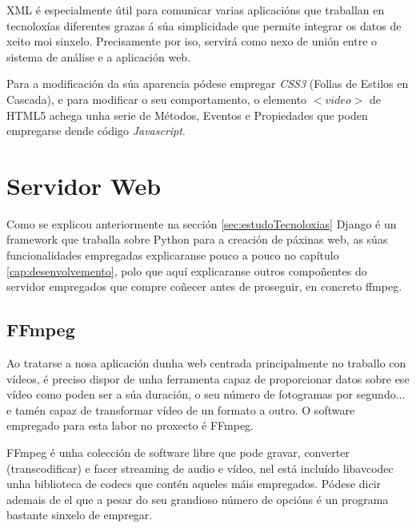    XML é especialmente útil para comunicar varias aplicacións que traballan en tecnoloxías 
    diferentes grazas á súa simplicidade que permite integrar os datos de xeito moi sinxelo. Precisamente
    por iso, servirá como nexo de unión entre o sistema de análise e a aplicación web. 
    
    Para a modificación da súa aparencia pódese empregar \emph{CSS3} (Follas de Estilos en 
    Cascada), e para modificar o seu comportamento, o elemento $<video>$ de HTML5 achega
    unha serie de Métodos, Eventos e Propiedades\cite{w3school-video-events} que poden
    empregarse dende código \emph{Javascript}.
    
\section{Servidor Web}
    Como se explicou anteriormente na sección \ref{sec:estudoTecnoloxias} Django é un framework
    que traballa sobre Python para a creación de páxinas web, as súas funcionalidades empregadas
    explicaranse pouco a pouco no capítulo \ref{cap:desenvolvemento}, polo que aquí explicaranse
    outros compoñentes do servidor empregados que compre coñecer antes de proseguir, en concreto 
    ffmpeg.
    
\subsection{FFmpeg}
    Ao tratarse a nosa aplicación dunha web centrada principalmente no traballo con vídeos, é 
    preciso dispor de unha ferramenta capaz de proporcionar datos sobre ese vídeo como poden ser 
    a súa duración, o seu número de fotogramas por segundo... e tamén capaz de transformar vídeo
    de un formato a outro. O software empregado para esta labor no proxecto é FFmpeg.

    FFmpeg é unha colección de software libre que pode gravar, converter (transcodificar) e facer
    streaming de audio e vídeo, nel está incluído libavcodec unha biblioteca de codecs que contén 
    aqueles máis empregados. Pódese dicir ademais de el que a pesar do seu grandioso número de 
    opcións é un programa bastante sinxelo de empregar.
    